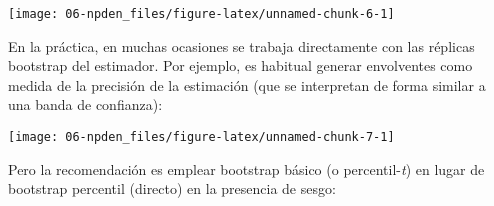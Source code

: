 \documentclass[
]{book}
\newenvironment{Shaded}{\begin{snugshade}}{\end{snugshade}}
\newcommand{\CommentTok}[1]{\textcolor[rgb]{0.56,0.35,0.01}{\textit{#1}}}
\newcommand{\DataTypeTok}[1]{\textcolor[rgb]{0.13,0.29,0.53}{#1}}
\newcommand{\DecValTok}[1]{\textcolor[rgb]{0.00,0.00,0.81}{#1}}
\newcommand{\KeywordTok}[1]{\textcolor[rgb]{0.13,0.29,0.53}{\textbf{#1}}}
\newcommand{\NormalTok}[1]{#1}
\newcommand{\OperatorTok}[1]{\textcolor[rgb]{0.81,0.36,0.00}{\textbf{#1}}}
\newcommand{\StringTok}[1]{\textcolor[rgb]{0.31,0.60,0.02}{#1}}
\theoremstyle{break}
\theoremstyle{definition}
\theoremstyle{definition}
\theoremstyle{definition}
\theoremstyle{remark}
\begin{document}
\begin{center}\texttt{[image: 06-npden\_files/figure-latex/unnamed-chunk-6-1]} \end{center}

En la práctica, en muchas ocasiones se trabaja directamente con
las réplicas bootstrap del estimador. Por ejemplo, es habitual
generar envolventes como medida de la precisión de la estimación
(que se interpretan de forma similar a una banda de confianza):

\begin{Shaded}
\end{Shaded}

\begin{center}\texttt{[image: 06-npden\_files/figure-latex/unnamed-chunk-7-1]} \end{center}

Pero la recomendación es emplear bootstrap básico (o percentil-\emph{t}) en lugar
de bootstrap percentil (directo) en la presencia de sesgo:

\begin{Shaded}
\end{Shaded}
\end{document}
